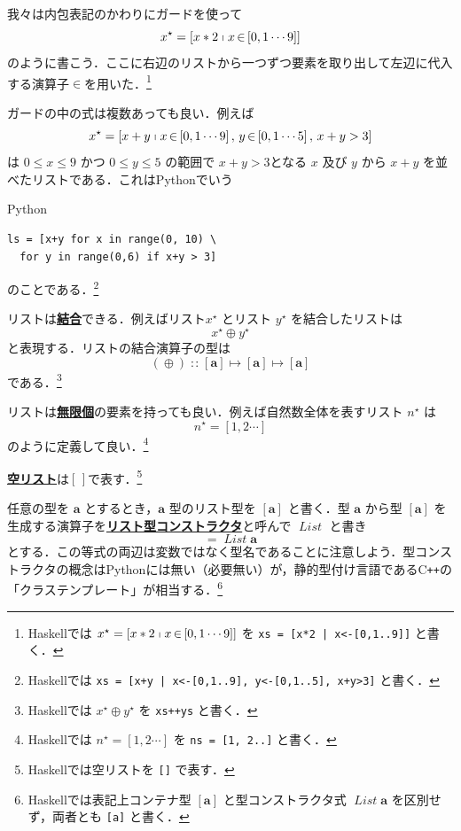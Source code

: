 \documentclass[a4paper,twocolumn]{jsbook}
\newcommand{\programminglanguage}[1]{\textsf{#1}}
\newcommand{\cxx}{\programminglanguage{C}\texttt{++}}
\newcommand{\haskell}{\programminglanguage{Haskell}}
\newcommand{\python}{\programminglanguage{Python}}
\newcommand{\keyword}[1]{{\underline{\textbf{#1}}}}
\newcommand{\code}[1]{\texttt{#1}}
\newenvironment{pythoncode}{\begin{itembox}[r]{\python}}{\end{itembox}}
\newcommand{\mEmptyList}{{[\,]}}
\DeclareMathOperator{\mAppend}{\oplus}
\DeclareMathOperator{\mFrom}{\in}
\DeclareMathOperator{\mIn}{{:\!:}}
\DeclareMathOperator{\mMapsTo}{\mapsto}
\newcommand{\mType}[1]{\mathbf{#1}}
\newcommand{\mListType}[1]{[\mType{#1}]}
\newcommand{\mTypeConstructor}[1]{\textit{#1}}
\DeclareMathOperator{\mListTypeConstructor}{\mTypeConstructor{List}}
\newcommand{\mListWith}[1]{\left[#1\right]}
\newcommand{\mList}[1]{{#1}^\mathrm{\star}}
\newcommand{\mListComp}[1]{\shortmid#1}
\newcommand{\mProj}[2]{#1\mMapsTo#2}
\begin{document}
我々は内包表記のかわりにガードを使って
\begin{equation}
\mList{x}=\mListWith{x*2\mListComp{x\mFrom{\mListWith{0,1\dotsb9}}}}
\end{equation}
のように書こう．ここに右辺のリストから一つずつ要素を取り出して左辺に代入する演算子$\mFrom$を用いた．\footnote{\haskell では $\mList{x}=\mListWith{x*2\mListComp{x\mFrom{\mListWith{0,1\dotsb9}}}}$ を \code{xs = [x*2 | x<-[0,1..9]]} と書く．}

ガードの中の式は複数あっても良い．例えば
\begin{equation}
\mList{x}
=\mListWith{x+y\mListComp{x\mFrom\mListWith{0,1\dotsb9},\,y\mFrom\mListWith{0,1\dotsb5},\,x+y>3}}
\end{equation}
は $0\le x\le9$ かつ $0\le y\le5$ の範囲で $x+y>3$となる $x$ 及び $y$ から $x+y$ を並べたリストである．これは\python でいう
\begin{pythoncode}
\begin{verbatim}
ls = [x+y for x in range(0, 10) \
  for y in range(0,6) if x+y > 3]
\end{verbatim}
\end{pythoncode}
のことである．\footnote{\haskell では \code{xs = [x+y | x<-[0,1..9], y<-[0,1..5], x+y>3]} と書く．}

リストは\keyword{結合}できる．例えばリスト$\mList{x}$ とリスト $\mList{y}$ を結合したリストは
\begin{equation}
\mList{x}\mAppend\mList{y}
\end{equation}
と表現する．リストの結合演算子の型は
\begin{equation}
(\mAppend)\mIn{}\mProj{\mListType{a}}{\mProj{\mListType{a}}{\mListType{a}}}
\end{equation}
である．\footnote{\haskell では $\mList{x}\mAppend\mList{y}$ を \code{xs++ys} と書く．}

リストは\keyword{無限個}の要素を持っても良い．例えば自然数全体を表すリスト $\mList{n}$ は
\begin{equation}
\mList{n}=\mListWith{1,2\dotsb}
\end{equation}
のように定義して良い．\footnote{\haskell では $\mList{n}=\mListWith{1,2\dotsb}$ を \code{ns = [1, 2..]} と書く．}

\keyword{空リスト}は$\mEmptyList$で表す．\footnote{\haskell では空リストを \code{[]} で表す．}

任意の型を $\mType{a}$ とするとき，$\mType{a}$ 型のリスト型を $\mListType{a}$ と書く．型 $\mType{a}$ から型 $\mListType{a}$ を生成する演算子を\keyword{リスト型コンストラクタ}と呼んで $\mListTypeConstructor$ と書き
\begin{equation}
\mListType{a}=\mListTypeConstructor\mType{a}
\end{equation}
とする．この等式の両辺は変数ではなく型名であることに注意しよう．型コンストラクタの概念は\python には無い（必要無い）が，静的型付け言語である\cxx の「クラステンプレート」が相当する．\footnote{\haskell では表記上コンテナ型 $\mListType{a}$ と型コンストラクタ式 $\mListTypeConstructor\mType{a}$ を区別せず，両者とも \code{[a]} と書く．}
\end{document}

